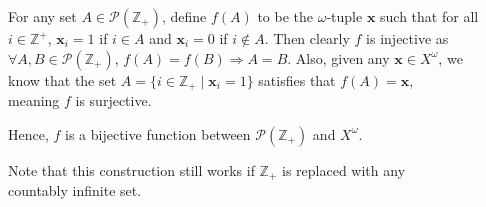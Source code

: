 \documentclass{book}
\newcommand{\myComment}{%
   \color{RawerSienna}%
   \fontsize{12}{14}\selectfont%
}
\newcommand{\exTwo}{%
\color{Purple}%
   \fontsize{13}{15}\selectfont%
}
\newenvironment{myIndent}{%
   \begin{adjustwidth}{2.5em}{0em}%
}{%
   \end{adjustwidth}%
}
\newenvironment{myTindent}{%
   \begin{adjustwidth}{7.5em}{0em}%
}{%
   \end{adjustwidth}%
}
\newcommand{\retTwo}{\hfill\bigbreak}
\begin{document}
   
   \begin{myIndent}\exTwo
      For any set $A \in \mathcal{P}(\mathbb{Z}_+)$, define $f(A)$ to be the $\omega$-tuple $\mathbf{x}$ such that for all\\ $i \in \mathbb{Z}^+$, $\mathbf{x}_i = 1$ if $i \in A$ and $\mathbf{x}_i = 0$ if $i \notin A$. Then clearly $f$ is injective as\\ $\forall A, B \in \mathcal{P}(\mathbb{Z}_+)$, $f(A) = f(B) \Longrightarrow A = B$. Also, given any $\mathbf{x} \in X^\omega$, we\\ know that the set $A = \{i \in \mathbb{Z}_+ \mid \mathbf{x}_i = 1\}$ satisfies that $f(A) = \mathbf{x}$,\\ meaning $f$ is surjective.
      
      \retTwo Hence, $f$ is a bijective function between $\mathcal{P}(\mathbb{Z}_+)$ and $X^\omega$.
      \begin{myTindent}\myComment
         Note that this construction still works if $\mathbb{Z}_+$ is replaced with any\\ countably infinite set.\retTwo\retTwo
      \end{myTindent}
   \end{myIndent}
\end{document}
